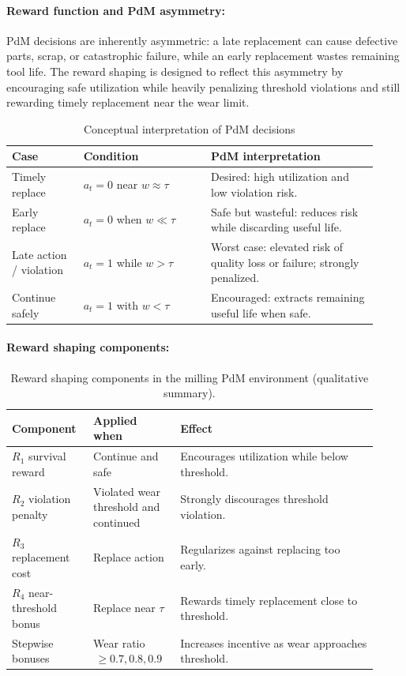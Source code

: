\documentclass[sn-basic]{sn-jnl} %
\begin{document}
\paragraph{Reward function and PdM asymmetry:}
PdM decisions are inherently asymmetric: a late replacement can cause defective parts, scrap, or catastrophic failure, while an early replacement wastes remaining tool life. The reward shaping is designed to reflect this asymmetry by encouraging safe utilization while heavily penalizing threshold violations and still rewarding timely replacement near the wear limit.

\begin{table}[htbp]
	\centering
	\caption{Conceptual interpretation of PdM decisions}
	\label{tab:cost_view}
	\begin{tabular}{L{0.18\linewidth} L{0.32\linewidth} L{0.42\linewidth}}
		\toprule
		\textbf{Case} & \textbf{Condition} & \textbf{PdM interpretation}\\
		\midrule
		Timely replace & $a_t=0$ near $w\approx\tau$ & Desired: high utilization and low violation risk.\\
		Early replace & $a_t=0$ when $w\ll\tau$ & Safe but wasteful: reduces risk while discarding useful life.\\
		Late action / violation & $a_t=1$ while $w>\tau$ & Worst case: elevated risk of quality loss or failure; strongly penalized.\\
		Continue safely & $a_t=1$ with $w<\tau$ & Encouraged: extracts remaining useful life when safe.\\
		\bottomrule
	\end{tabular}
\end{table}

\paragraph{Reward shaping components:}
\begin{table}[htbp]
	\centering
	\caption{Reward shaping components in the milling PdM environment (qualitative summary).}
	\label{tab:reward_components}
	\begin{tabular}{L{0.20\linewidth} L{0.22\linewidth} L{0.50\linewidth}}
		\toprule
		\textbf{Component} & \textbf{Applied when} & \textbf{Effect}\\
		\midrule
		$R_1$ survival reward & Continue and safe & Encourages utilization while below threshold.\\
		$R_2$ violation penalty & Violated wear threshold and continued & Strongly discourages threshold violation.\\
		$R_3$ replacement cost & Replace action & Regularizes against replacing too early.\\
		$R_4$ near-threshold bonus & Replace near $\tau$ & Rewards timely replacement close to threshold.\\
		Stepwise bonuses & Wear ratio $\,\ge 0.7, 0.8, 0.9$ & Increases incentive as wear approaches threshold.\\
		\bottomrule
	\end{tabular}
\end{table}
\end{document}

